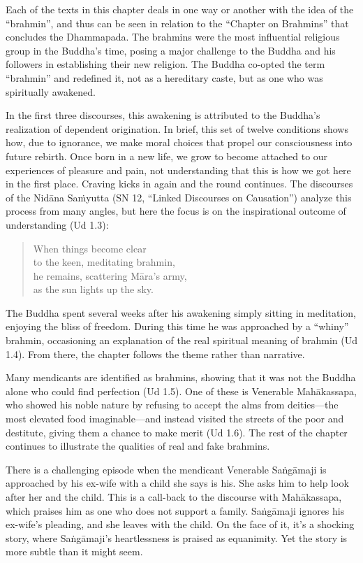 \documentclass[12pt,openany]{book}%
\begin{document}
Each of the texts in this chapter deals in one way or another with the idea of the “brahmin”, and thus can be seen in relation to the “Chapter on Brahmins” that concludes the Dhammapada. The brahmins were the most influential religious group in the Buddha’s time, posing a major challenge to the Buddha and his followers in establishing their new religion. The Buddha co-opted the term “brahmin” and redefined it, not as a hereditary caste, but as one who was spiritually awakened. 

In the first three discourses, this awakening is attributed to the Buddha’s realization of dependent origination. In brief, this set of twelve conditions shows how, due to ignorance, we make moral choices that propel our consciousness into future rebirth. Once born in a new life, we grow to become attached to our experiences of pleasure and pain, not understanding that this is how we got here in the first place. Craving kicks in again and the round continues. The discourses of the \textsanskrit{Nidāna} \textsanskrit{Saṁyutta} (SN 12, “Linked Discourses on Causation”) analyze this process from many angles, but here the focus is on the inspirational outcome of understanding (Ud 1.3):

\begin{quotation}%
When things become clear \\
to the keen, meditating brahmin, \\
he remains, scattering \textsanskrit{Māra}’s army, \\
as the sun lights up the sky.

%
\end{quotation}

The Buddha spent several weeks after his awakening simply sitting in meditation, enjoying the bliss of freedom. During this time he was approached by a “whiny” brahmin, occasioning an explanation of the real spiritual meaning of brahmin (Ud 1.4). From there, the chapter follows the theme rather than narrative.

Many mendicants are identified as brahmins, showing that it was not the Buddha alone who could find perfection (Ud 1.5). One of these is Venerable \textsanskrit{Mahākassapa}, who showed his noble nature by refusing to accept the alms from deities—the most elevated food imaginable—and instead visited the streets of the poor and destitute, giving them a chance to make merit (Ud 1.6). The rest of the chapter continues to illustrate the qualities of real and fake brahmins. 

There is a challenging episode when the mendicant Venerable \textsanskrit{Saṅgāmaji} is approached by his ex-wife with a child she says is his. She asks him to help look after her and the child. This is a call-back to the discourse with \textsanskrit{Mahākassapa}, which praises him as one who does not support a family. \textsanskrit{Saṅgāmaji} ignores his ex-wife’s pleading, and she leaves with the child. On the face of it, it’s a shocking story, where \textsanskrit{Saṅgāmaji}’s heartlessness is praised as equanimity. Yet the story is more subtle than it might seem. 
\end{document}
